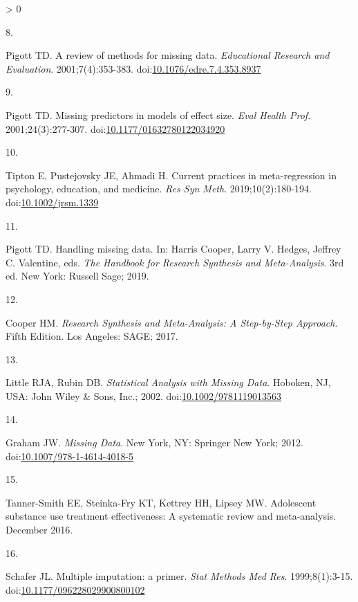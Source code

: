 \documentclass[
]{article}
\newlength{\cslhangindent}
\newlength{\csllabelwidth}
\newenvironment{CSLReferences}[2] %
 {%
  \setlength{\parindent}{0pt}
  \ifodd #1 \everypar{\setlength{\hangindent}{\cslhangindent}}\ignorespaces\fi
  \ifnum #2 > 0
  \setlength{\parskip}{#2\baselineskip}
  \fi
 }%
 {}
\newcommand{\CSLLeftMargin}[1]{\parbox[t]{\csllabelwidth}{#1}}
\newcommand{\CSLRightInline}[1]{\parbox[t]{\linewidth - \csllabelwidth}{#1}\break}
\begin{document}
\begin{CSLReferences}{0}{0}
\leavevmode\hypertarget{ref-pigottReviewMethodsMissing2001}{}%
\CSLLeftMargin{8. }
\CSLRightInline{Pigott TD. A review of methods for missing data. \emph{Educational Research and Evaluation}. 2001;7(4):353-383. doi:\href{https://doi.org/10.1076/edre.7.4.353.8937}{10.1076/edre.7.4.353.8937}}

\leavevmode\hypertarget{ref-pigottMissingPredictorsModels2001}{}%
\CSLLeftMargin{9. }
\CSLRightInline{Pigott TD. Missing predictors in models of effect size. \emph{Eval Health Prof}. 2001;24(3):277-307. doi:\href{https://doi.org/10.1177/01632780122034920}{10.1177/01632780122034920}}

\leavevmode\hypertarget{ref-tiptonCurrentPracticesMetaregression2019}{}%
\CSLLeftMargin{10. }
\CSLRightInline{Tipton E, Pustejovsky JE, Ahmadi H. Current practices in meta-regression in psychology, education, and medicine. \emph{Res Syn Meth}. 2019;10(2):180-194. doi:\href{https://doi.org/10.1002/jrsm.1339}{10.1002/jrsm.1339}}

\leavevmode\hypertarget{ref-pigottHandlingMissingData2019}{}%
\CSLLeftMargin{11. }
\CSLRightInline{Pigott TD. Handling missing data. In: Harris Cooper, Larry V. Hedges, Jeffrey C. Valentine, eds. \emph{The Handbook for Research Synthesis and Meta-Analysis}. 3rd ed. New York: Russell Sage; 2019.}

\leavevmode\hypertarget{ref-cooperResearchSynthesisMetaanalysis2017}{}%
\CSLLeftMargin{12. }
\CSLRightInline{Cooper HM. \emph{Research Synthesis and Meta-Analysis: A Step-by-Step Approach}. Fifth Edition. Los Angeles: SAGE; 2017.}

\leavevmode\hypertarget{ref-littleStatisticalAnalysisMissing2002}{}%
\CSLLeftMargin{13. }
\CSLRightInline{Little RJA, Rubin DB. \emph{Statistical Analysis with Missing Data}. Hoboken, NJ, USA: John Wiley \& Sons, Inc.; 2002. doi:\href{https://doi.org/10.1002/9781119013563}{10.1002/9781119013563}}

\leavevmode\hypertarget{ref-grahamMissingData2012}{}%
\CSLLeftMargin{14. }
\CSLRightInline{Graham JW. \emph{Missing Data}. New York, NY: Springer New York; 2012. doi:\href{https://doi.org/10.1007/978-1-4614-4018-5}{10.1007/978-1-4614-4018-5}}

\leavevmode\hypertarget{ref-tanner-smithAdolescentSubstanceUse2016}{}%
\CSLLeftMargin{15. }
\CSLRightInline{Tanner-Smith EE, Steinka-Fry KT, Kettrey HH, Lipsey MW. Adolescent substance use treatment effectiveness: A systematic review and meta-analysis. December 2016.}

\leavevmode\hypertarget{ref-schaferMultipleImputationPrimer1999}{}%
\CSLLeftMargin{16. }
\CSLRightInline{Schafer JL. Multiple imputation: a primer. \emph{Stat Methods Med Res}. 1999;8(1):3-15. doi:\href{https://doi.org/10.1177/096228029900800102}{10.1177/096228029900800102}}


\end{CSLReferences}
\end{document}
